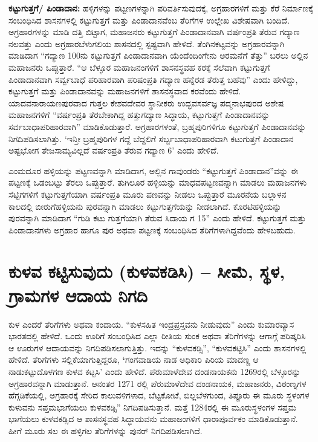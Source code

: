 \textbf{ಕಟ್ಟುಗುತ್ತಗೆ/ ಪಿಂಡಾದಾನ:} ಹಳ್ಳಿಗಳನ್ನು ಪಟ್ಟಣಗಳನ್ನಾಗಿ ಪರಿವರ್ತಿಸುವುದಕ್ಕೆ, ಅಗ್ರಹಾರಗಳಿಗೆ ಮತ್ತು ಕೆರೆ ನಿರ್ಮಾಣಕ್ಕೆ ಸಂಬಂಧಿಸಿದ ಶಾಸನಗಳಲ್ಲಿ ಕಟ್ಟುಗುತ್ತಗೆ ಮತ್ತು ಪಿಂಡಾದಾನವೆಂಬ ತೆರಿಗೆಗಳ ಉಲ್ಲೇಖ ವಿಶೇಷವಾಗಿ ಬಂದಿದೆ. ಅಗ್ರಹಾರಗಳನ್ನು ಮಾಡಿ ದತ್ತಿ ಬಿಟ್ಟಾಗ, ಮಹಾಜನರು ಕಟ್ಟುಗುತ್ತಗೆ ಪಿಂಡಾದಾನವಾಗಿ ವರ್ಷಂಪ್ರತಿ ತೆರುವ ಗದ್ಯಾಣ ನಲವತ್ತು ಎಂದು ಅಗ್ರಹಾರಬೆಳುಗಲಿಯ ಶಾಸನದಲ್ಲಿ ಸ್ಪಷ್ಟವಾಗಿ ಹೇಳಿದೆ. ತೆಂಗಿನಕಟ್ಟವನ್ನು ಅಗ್ರಹಾರವನ್ನಾಗಿ ಮಾಡಿದಾಗ “ಗದ್ಯಾಣ 100ನು ಕಟ್ಟುಗುತ್ತಗೆ ಪಿಂಡಾದಾನವಾಗಿ ಯೆಂದೆಂದಿಂಗೇನು ಅರಮನೆಗೆ ತೆತ್ತು” ಬರಲು ಅಲ್ಲಿನ ಮಹಾಜನರು ಒಪ್ಪುತ್ತಾರೆ. “ಆ ಬೆಳ್ಳೂರ ಮಹಾಜನಂಗಳಿಗೆ ಶಾಸನಸ್ಥವಹ ಕರಕ್ಕೆ ಸೆಲೆವಾಗಿ ಕಟ್ಟುಗುತ್ತಗೆ ಪಿಂಡಾದಾನವಾಗಿ ಸರ್ವ್ವಬಾಧೆ ಪರಿಹಾರವಾಗಿ ಪರಿಷಂಪ್ರತಿ ಗದ್ಯಾಣ ಹನ್ನೆರಡ ತೆರುತ್ತ ಬಹೆವು” ಎಂದು ಹೇಳಿದ್ದು, ಕಟ್ಟುಗುತ್ತಗೆ ಮತ್ತು ಪಿಂಡಾದಾನವನ್ನು ಮಹಾಜನಗಳಿಗೆ ಶಾಸನಸ್ಥವಾದ ಕರವೆಂದು ಹೇಳಿದೆ. ಯಾದವನಾರಾಯಣಪುರವಾದ ಗುತ್ತಲ ಕೇಶವದೇವರ ಸ್ಥಾನೀಕರು ಉದ್ಭವಸರ್ವಜ್ಞ ಪದ್ಮನಾಭಪುರದ ಅಶೇಷ ಮಹಾಜನಗಳಿಗೆ “ವರ್ಷಂಪ್ರತಿ ತೆರಬೇಕಾಗಿದ್ದ ಹತ್ತುಗದ್ಯಾಣ ಸಿದ್ಧಾಯ, ಕಟ್ಟುಗುತ್ತಗೆ ಪಿಂಡಾದಾನವನ್ನು ಸರ್ವಬಾಧಾಪರಿಹಾರವಾಗಿ” ಮಾಡಿಕೊಡುತ್ತಾರೆ. ಅಗ್ರಹಾರಗಳಂತೆ, ಬ್ರಹ್ಮಪುರಿಗಳಿಗೂ ಕಟ್ಟುಗುತ್ತಗೆ ಪಿಂಡಾದಾನವನ್ನು ನಿಗದಿಪಡಿಸಲಾಗಿತ್ತು. ‘ಇನ್ತೀ ಬ್ರಹ್ಮಪುರಿಗಳ ಗದ್ದೆ ಬೆದ್ದಲಿಗೆ ಸರ್ಬ್ಬಬಾಧಾಪರಿಹಾರವಾಗಿ ಕಟುಗುತ್ತಗೆ ಪಿಂಡಾದಾನ ಅಷ್ಟಭೋಗ ತೇಜಸಾಮ್ಯವಿಲ್ಲದೆ ವರ್ಷಂಪ್ರತಿ ತೆರುವ ಗದ್ಯಾಣ 6’ ಎಂದು ಹೇಳಿದೆ.

ಎಂಮದೂರ ಹಳ್ಳಿಯನ್ನು ಪಟ್ಟಣವನ್ನಾಗಿ ಮಾಡಿದಾಗ, ಅಲ್ಲಿನ ಗಾವುಂಡರು “ಕಟ್ಟುಗುತ್ತಗೆ ಪಿಂಡಾದಾನ”ವನ್ನು ಈ ಪಟ್ಟಣಕ್ಕೆ ಒಡಂಬಟ್ಟು ತೆರಲು ಒಪ್ಪುತ್ತಾರೆ. ತುಗಿಲೂರ ಹಳ್ಳಿಯನ್ನು ಮಾಧವಪಟ್ಟಣವನ್ನಾಗಿ ಮಾಡಲು ಮಹಾಜನಗಳು ಸೆಟ್ಟಿಗಗಳಿಗೆ ಕಟ್ಟುಗುತ್ತಗೆಯಾಗಿ ವರ್ಷಂಪ್ರತಿ ಮೂರು ಪಣವನ್ನು ನೀಡಲು ಒಪ್ಪುತ್ತಾರೆ ಮೂರನೆಯ ಬಲ್ಲಾಳನ ಕಾಲದಲ್ಲಿ ಬೀರುಗೆಹಳ್ಳಿಯನು ಪುರವನ್ನಾಗಿ ಮಾಡಲು ಕಟ್ಟುಗುತ್ತಗೆಯನ್ನು ನೀಡಲಾಗಿದೆ. ಕೊರಟಿಹಳ್ಳಿಯನ್ನು ಪುರವನ್ನಾಗಿ ಮಾಡಿದಾಗ “ಗುಡಿ ಕಟು ಗುತ್ತಗೆಯಾಗಿ ತೆರುವ ಸಿದಾಯ ಗ 15” ಎಂದು ಹೇಳಿದೆ. ಕಟ್ಟುಗುತ್ತಗೆ ಮತ್ತು ಪಿಂಡಾದಾನಗಳು ಅಗ್ರಹಾರ ಹಾಗೂ ಪುರ ಅಥವಾ ಪಟ್ಟಣಕ್ಕೆ ಸಂಬಂಧಿಸಿದ ತೆರಿಗೆಗಳಾಗಿದ್ದವೆಂದು ಹೇಳಬಹುದು.


\section{ಕುಳವ ಕಟ್ಟಿಸುವುದು (ಕುಳವಕಡಿಸಿ) – ಸೀಮೆ, ಸ್ಥಳ, ಗ್ರಾಮಗಳ ಆದಾಯ ನಿಗದಿ}

ಕುಳ ಎಂದರೆ ತೆರಿಗೆಗಳು ಅಥವಾ ಕಂದಾಯ. “ಕುಳಸಹಿತ ಇಂದ್ರಪ್ರಸ್ತವನು ನೀಡುವುದು” ಎಂದು ಕುಮಾರವ್ಯಾಸ ಭಾರತದಲ್ಲಿ ಹೇಳಿದೆ. ಒಂದು ಊರಿಗೆ ಸಂಬಂಧಿಸಿದ ಎಲ್ಲಾ ರೀತಿಯ ಸುಂಕ ಅಥವಾ ತೆರಿಗೆಗಳನ್ನು ಆಗಾಗ್ಗೆ ಪರಿಷ್ಕರಿಸಿ ಆ ಊರುಗಳ ಆದಾಯವನ್ನು ನಿಗದಿಪಡಿಸಲಾಗುತ್ತಿತ್ತು. ಇದನ್ನು “ಕುಳವಕಡ್ಸಿ”, “ಕುಳವಕಟ್ಟಿಸಿ” ಎಂದು ಶಾಸನಗಳಲ್ಲಿ ಹೇಳಿದೆ.\textbf{ }ತೆರಿಗೆಗಳು ಸಲ್ಲಿಕೆಯಾಗುತ್ತಿದ್ದರೂ,\textbf{ ‘}ಗಂಗವಾಡಿಯ ನಾಡ ಅಧಿಕಾರಿ ಪಿರಿಯ ಮಾದಣ್ಣ ಆ ನಾಡುಕಟ್ಟುದೊಳಗಣ ಕುಳವ ಕಟ್ಟಸಿ’ ಎಂದು ಹೇಳಿದೆ. ಪೆರುಮಾಳೆದೇವ ದಂಡನಾಯಕನು 1269ರಲ್ಲಿ ಬೆಳ್ಳೂರನ್ನು ಅಗ್ರಹಾರವನ್ನಾಗಿ ಮಾಡುತ್ತಾನೆ. ಆನಂತರ 1271 ರಲ್ಲಿ ಪೆರುಮಾಳೆದೇವ ದಂಡನಾಯಕ, ಮಹಾಜನರು, ವಿಠಂಣ್ನಗಳ ಹೆಗ್ಗಡಿಕೆಯಲ್ಲಿ, ಅಗ್ರಹಾರಕ್ಕೆ ಸೇರಿದ ಕಾಲುವಳಿಗಳಾದ, ಬೆಟ್ಟಕೋಟೆ, ಬಿಲ್ಲಬೆಳಗುಂದ, ತಿಪ್ಪೂರು ಈ ಮೂರು ಸ್ಥಳಂಗಳ ಕುಳುವನು ಸಪ್ತಮಭಾಗೆಯಲು ಕುಳವಕಡ್ಸಿ” ನಿಗದಿಪಡಿಸುತ್ತಾನೆ. ಮತ್ತೆ 1284ರಲ್ಲಿ ಈ ಮೂರುಸ್ಥಳಂಗಳ ಸಪ್ತಮ ಭಾಗೆಯಲು ಕುಳವಕಡ್ಸಿದ ಆ ಶಾಸನಸ್ಥವಹ ಸಿದ್ಧಾಯವನು ಮಹಾಜಂಗಳಿಗೆ ಧಾರಾಪೂರ್ವಕಂ ಮಾಡಿಕೊಡುತ್ತಾನೆ. ಹೀಗೆ ಮೂರು ಸಲ ಈ ಹಳ್ಳಿಗಲ ತೆರಿಗೆಗಳನ್ನು ಪುನರ್​ ನಿಗದಿಪಡಿಸಲಾಗಿದೆ.

